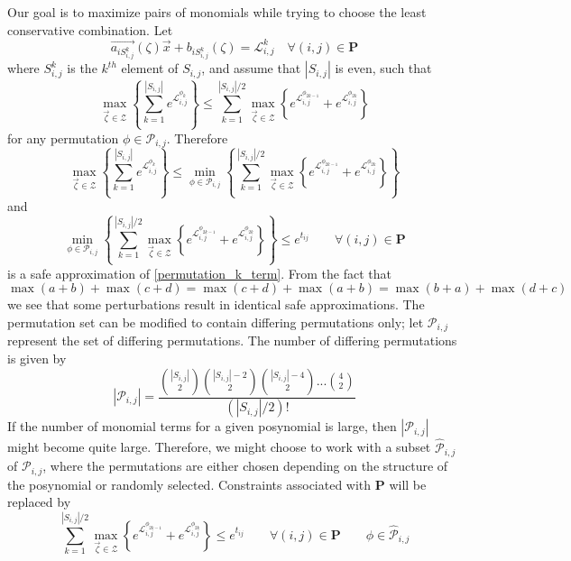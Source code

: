 Our goal is to maximize pairs of monomials while trying to choose the least conservative combination. Let 
$$
\vec{a_{iS_{i,j}^k}}\left(\zeta\right)\vec{x} + b_{iS_{i,j}^k}\left(\zeta\right) = \mathcal{L}^k_{i,j}\quad \forall (i,j) \in \mathbf{P}
$$
where $S_{i,j}^k$ is the $k^{th}$ element of $S_{i,j}$, and assume that $|S_{i,j}|$ is even, such that
$$
\max_{\vec{\zeta} \in \mathcal{Z}} \left\{\textstyle{\sum}_{k=1}^{|S_{i,j}|} e^{\mathcal{L}^{\phi_k}_{i,j}}\right\} \leq \textstyle{\sum}_{k=1}^{|S_{i,j}|/2} \max_{\vec{\zeta} \in \mathcal{Z}} \left\{e^{\mathcal{L}^{\phi_{2k-1}}_{i,j}} + e^{\mathcal{L}^{\phi_{2k}}_{i,j}}\right\}
$$
for any permutation $\phi \in \mathcal{P}_{i,j}$. Therefore
$$
\max_{\vec{\zeta} \in \mathcal{Z}} \left\{\textstyle{\sum}_{k=1}^{|S_{i,j}|} e^{\mathcal{L}^{\phi_k}_{i,j}}\right\} \leq \min_{\phi \in \mathcal{P}_{i,j}}\left\{\textstyle{\sum}_{k=1}^{|S_{i,j}|/2} \max_{\vec{\zeta} \in \mathcal{Z}} \left\{e^{\mathcal{L}^{\phi_{2k-1}}_{i,j}} + e^{\mathcal{L}^{\phi_{2k}}_{i,j}}\right\}\right\}
$$
and
\begin{equation}
\min_{\phi \in \mathcal{P}_{i,j}}\left\{\textstyle{\sum}_{k=1}^{|S_{i,j}|/2} \max_{\vec{\zeta} \in \mathcal{Z}} \left\{e^{\mathcal{L}^{\phi_{2k-1}}_{i,j}} + e^{\mathcal{L}^{\phi_{2k}}_{i,j}}\right\}\right\} \leq e^{t_{ij}} \qquad \forall (i, j) \in \mathbf{P}
\label{min_safe_app}
\end{equation}
is a safe approximation of \eqref{permutation_k_term}. From the fact that
$$
\max(a + b) + \max(c + d) = \max(c + d) +  \max(a + b) = \max(b + a) + \max(d + c)
$$
we see that some perturbations result in identical safe approximations. The permutation set can be modified to contain differing permutations only; let $\mathcal{P}_{i,j}$ represent the set of differing permutations. The number of differing permutations is given by
\begin{equation}
|\mathcal{P}_{i,j}| = \frac{\binom{|S_{i,j}|}{2}\binom{|S_{i,j}|-2}{2}\binom{|S_{i,j}|-4}{2}...\binom{4}{2}}{(|S_{i,j}|/2)!}
\label{no_pert_even}
\end{equation}
If the number of monomial terms for a given posynomial is large, then $|\mathcal{P}_{i,j}|$ might become quite large. Therefore, we might choose to work with a subset $\hat{\mathcal{P}}_{i,j}$ of $\mathcal{P}_{i,j}$, where the permutations are either chosen depending on the structure of the posynomial or randomly selected. Constraints associated with $\mathbf{P}$ will be replaced by 
\begin{equation}
\textstyle{\sum}_{k=1}^{|S_{i,j}|/2} {\displaystyle \max_{\vec{\zeta} \in \mathcal{Z}}} \left\{e^{\mathcal{L}^{\phi_{2k-1}}_{i,j}} + e^{\mathcal{L}^{\phi_{2k}}_{i,j}}\right\}\leq e^{t_{ij}} \qquad \forall (i, j) \in \mathbf{P} \qquad \phi \in \hat{\mathcal{P}}_{i,j}
\label{two_term_max_even}
\end{equation}
